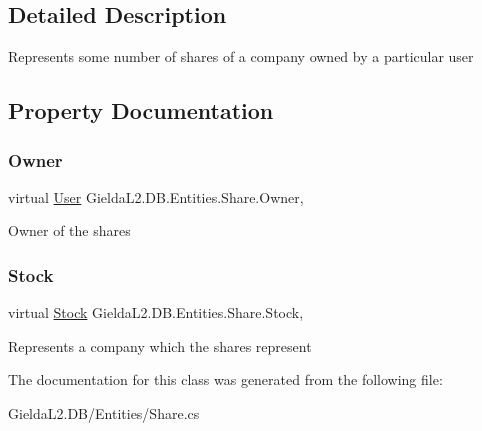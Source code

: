 \subsection{Detailed Description}
Represents some number of shares of a company owned by a particular user 



\subsection{Property Documentation}
\mbox{\label{class_gielda_l2_1_1_d_b_1_1_entities_1_1_share_ae2ad308ad36837a00e09d1bf49e6890b}} 
\subsubsection{\texorpdfstring{Owner}{Owner}}
{\footnotesize\ttfamily virtual \mbox{\hyperlink{class_gielda_l2_1_1_d_b_1_1_entities_1_1_user}{User}} Gielda\+L2.\+D\+B.\+Entities.\+Share.\+Owner\hspace{0.3cm}{\ttfamily [get]}, {\ttfamily [set]}}



Owner of the shares 

\mbox{\label{class_gielda_l2_1_1_d_b_1_1_entities_1_1_share_a9cf67a983e7ae7ba34ef200c971afe61}} 
\subsubsection{\texorpdfstring{Stock}{Stock}}
{\footnotesize\ttfamily virtual \mbox{\hyperlink{class_gielda_l2_1_1_d_b_1_1_entities_1_1_stock}{Stock}} Gielda\+L2.\+D\+B.\+Entities.\+Share.\+Stock\hspace{0.3cm}{\ttfamily [get]}, {\ttfamily [set]}}



Represents a company which the shares represent 



The documentation for this class was generated from the following file\+:\begin{DoxyCompactItemize}
\item 
Gielda\+L2.\+D\+B/\+Entities/Share.\+cs\end{DoxyCompactItemize}
